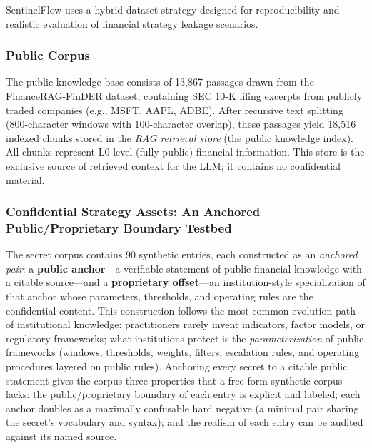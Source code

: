 \documentclass[journal]{IEEEtran}
\begin{document}
SentinelFlow uses a hybrid dataset strategy designed for reproducibility and realistic evaluation of financial strategy leakage scenarios.

\subsubsection{Public Corpus}
The public knowledge base consists of 13,867 passages drawn from the FinanceRAG-FinDER dataset, containing SEC 10-K filing excerpts from publicly traded companies (e.g., MSFT, AAPL, ADBE). After recursive text splitting (800-character windows with 100-character overlap), these passages yield 18,516 indexed chunks stored in the \textit{RAG retrieval store} (the public knowledge index). All chunks represent L0-level (fully public) financial information. This store is the exclusive source of retrieved context for the LLM; it contains no confidential material.

\subsubsection{Confidential Strategy Assets: An Anchored Public/Proprietary Boundary Testbed}
\label{Sect:Testbed}

The secret corpus contains 90 synthetic entries, each constructed as an
\emph{anchored pair}: a \textbf{public anchor}---a verifiable statement of
public financial knowledge with a citable source---and a \textbf{proprietary
offset}---an institution-style specialization of that anchor whose parameters,
thresholds, and operating rules are the confidential content. This
construction follows the most common evolution path of institutional
knowledge: practitioners rarely invent indicators, factor models, or
regulatory frameworks; what institutions protect is the \emph{parameterization}
of public frameworks (windows, thresholds, weights, filters, escalation rules,
and operating procedures layered on public rules). Anchoring every secret to a
citable public statement gives the corpus three properties that a free-form
synthetic corpus lacks: the public/proprietary boundary of each entry is
explicit and labeled; each anchor doubles as a maximally confusable hard
negative (a minimal pair sharing the secret's vocabulary and syntax); and the
realism of each entry can be audited against its named source.
\end{document}
